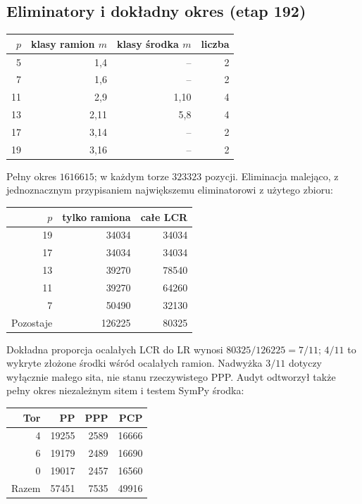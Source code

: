 \documentclass[11pt,a4paper]{article}
\theoremstyle{definition}\newtheorem{defn}[tw]{Definicja}
\theoremstyle{remark}\newtheorem*{uw}{Uwaga}
\begin{document}
\subsection{Eliminatory i dokładny okres (etap 192)}
\begin{center}
\begin{tabular}{rrrr}
\toprule $p$&klasy ramion $m$&klasy środka $m$&liczba\\\midrule
5&1,4&--&2\\7&1,6&--&2\\11&2,9&1,10&4\\13&2,11&5,8&4\\17&3,14&--&2\\19&3,16&--&2\\\bottomrule
\end{tabular}
\end{center}
Pełny okres $1616615$; w każdym torze $323323$ pozycji. Eliminacja malejąco,
z jednoznacznym przypisaniem największemu eliminatorowi z użytego zbioru:
\begin{center}
\begin{tabular}{rrr}
\toprule $p$&tylko ramiona&całe LCR\\\midrule
19&34034&34034\\17&34034&34034\\13&39270&78540\\11&39270&64260\\7&50490&32130\\\midrule
Pozostaje&126225&80325\\\bottomrule
\end{tabular}
\end{center}
Dokładna proporcja ocalałych LCR do LR wynosi $80325/126225=7/11$;
$4/11$ to wykryte złożone środki wśród ocalałych ramion. Nadwyżka $3/11$
dotyczy wyłącznie małego sita, nie stanu rzeczywistego PPP. Audyt
odtworzył także pełny okres niezależnym sitem i testem SymPy środka:
\begin{center}
\begin{tabular}{rrrr}
\toprule Tor&PP&PPP&PCP\\\midrule
4&19255&2589&16666\\6&19179&2489&16690\\0&19017&2457&16560\\
Razem&57451&7535&49916\\\bottomrule
\end{tabular}
\end{center}
\end{document}
